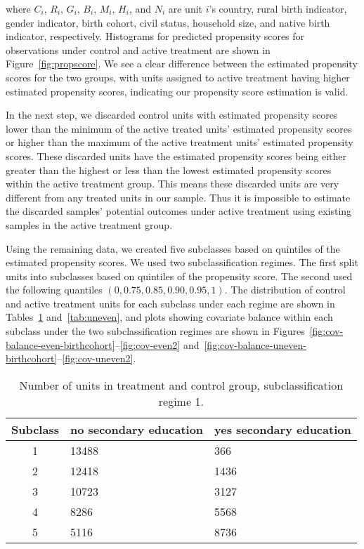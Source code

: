 \documentclass[letterpaper,11pt]{article}
\begin{document}
where $C_{i},\, R_{i},\, G_{i},\, B_{i},\, M_{i},\, H_{i}$, and $N_{i}$ are unit
$i$'s country, rural birth indicator, gender indicator, birth cohort, civil
status, household size, and native birth indicator, respectively. Histograms for
predicted propensity scores for observations under control and active treatment
are shown in Figure~\ref{fig:propscore}. We see a clear difference between the
estimated propensity scores for the two groups, with units assigned to active
treatment having higher estimated propensity scores, indicating our propensity
score estimation is valid.

In the next step, we discarded control units with estimated propensity scores
lower than the minimum of the active treated units' estimated propensity scores
or higher than the maximum of the active treatment units' estimated propensity
scores. These discarded units have the estimated propensity scores being either
greater than the highest or less than the lowest estimated propensity scores
within the active treatment group. This means these discarded units are very
different from any treated units in our sample. Thus it is impossible to
estimate the discarded samples' potential outcomes under active treatment using
existing samples in the active treatment group.

Using the remaining data, we created five subclasses based on quintiles of the
estimated propensity scores. We used two subclassification regimes. The first
split units into subclasses based on quintiles of the propensity score. The
second used the following quantiles $(0,0.75,0.85,0.90,0.95,1)$. The
distribution of control and active treatment units for each subclass under each
regime are shown in Tables~\ref{tab:even} and~\ref{tab:uneven}, and plots
showing covariate balance within each subclass under the two subclassification
regimes are shown in
Figures~\ref{fig:cov-balance-even-birthcohort}--\ref{fig:cov-even2}
and~\ref{fig:cov-balance-uneven-birthcohort}--\ref{fig:cov-uneven2}.

\begin{table}[htb]
\centering %
\begin{tabular}{cp{2.4cm}p{2.4cm}}
\hline 
Subclass  & no secondary education  & yes secondary education \tabularnewline
\hline 
1  & 13488  & 366 \tabularnewline
2  & 12418  & 1436 \tabularnewline
3  & 10723  & 3127 \tabularnewline
4  & 8286  & 5568 \tabularnewline
5  & 5116  & 8736 \tabularnewline
\hline 
\end{tabular}
\caption{Number of units in treatment and control group, subclassification
regime 1.}
\label{tab:even} 
\end{table}
\end{document}
